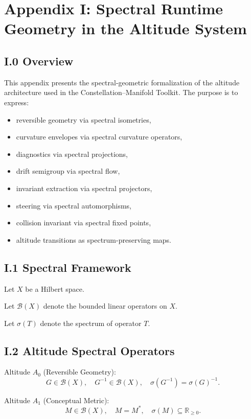 \appendix
\section*{Appendix I: Spectral Runtime Geometry in the Altitude System}

\subsection*{I.0 Overview}

This appendix presents the spectral-geometric formalization of the
altitude architecture used in the Constellation–Manifold Toolkit.
The purpose is to express:
\begin{itemize}
    \item reversible geometry via spectral isometries,
    \item curvature envelopes via spectral curvature operators,
    \item diagnostics via spectral projections,
    \item drift semigroup via spectral flow,
    \item invariant extraction via spectral projectors,
    \item steering via spectral automorphisms,
    \item collision invariant via spectral fixed points,
    \item altitude transitions as spectrum-preserving maps.
\end{itemize}

\subsection*{I.1 Spectral Framework}

Let $X$ be a Hilbert space.

Let $\mathcal{B}(X)$ denote the bounded linear operators on $X$.

Let $\sigma(T)$ denote the spectrum of operator $T$.

\subsection*{I.2 Altitude Spectral Operators}

Altitude $A_0$ (Reversible Geometry):
\[
G \in \mathcal{B}(X),\quad G^{-1} \in \mathcal{B}(X),\quad
\sigma(G^{-1}) = \sigma(G)^{-1}.
\]

Altitude $A_1$ (Conceptual Metric):
\[
M \in \mathcal{B}(X),\quad M = M^*,\quad \sigma(M) \subseteq \mathbb{R}_{\ge 0}.
\]


